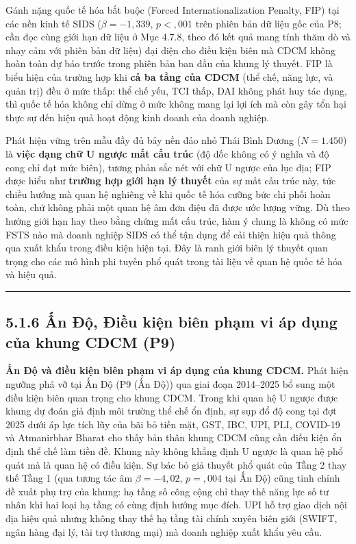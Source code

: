 \documentclass[
  a4paper,
  13pt]{extreport}
\begin{document}
Gánh nặng quốc tế hóa bắt buộc (Forced Internationalization Penalty,
FIP) tại các nền kinh tế SIDS (\(\beta = -1{,}339\), \(p < {,}001\) trên
phiên bản dữ liệu gốc của P8; cần đọc cùng giới hạn dữ liệu ở Mục 4.7.8,
theo đó kết quả mang tính thăm dò và nhạy cảm với phiên bản dữ liệu) đại
diện cho điều kiện biên mà CDCM không hoàn toàn dự báo trước trong phiên
bản ban đầu của khung lý thuyết. FIP là biểu hiện của trường hợp khi
\textbf{cả ba tầng của CDCM} (thể chế, năng lực, và quản trị) đều ở mức
thấp: thể chế yếu, TCI thấp, DAI không phát huy tác dụng, thì quốc tế
hóa không chỉ dừng ở mức không mang lại lợi ích mà còn gây tổn hại thực
sự đến hiệu quả hoạt động kinh doanh của doanh nghiệp.

Phát hiện vững trên mẫu đầy đủ bảy nền đảo nhỏ Thái Bình Dương
(\(N = 1.450\)) là \textbf{việc dạng chữ U ngược mất cấu trúc} (độ dốc
không có ý nghĩa và độ cong chỉ đạt mức biên), tương phản sắc nét với
chữ U ngược của lục địa; FIP được hiểu như \textbf{trường hợp giới hạn
lý thuyết} của sự mất cấu trúc này, tức chiều hướng mà quan hệ nghiêng
về khi quốc tế hóa cưỡng bức chi phối hoàn toàn, chứ không phải một quan
hệ âm đơn điệu đã được ước lượng vững. Dù theo hướng giới hạn hay theo
bằng chứng mất cấu trúc, hàm ý chung là không có mức FSTS nào mà doanh
nghiệp SIDS có thể tận dụng để cải thiện hiệu quả thông qua xuất khẩu
trong điều kiện hiện tại. Đây là ranh giới biên lý thuyết quan trọng cho
các mô hình phi tuyến phổ quát trong tài liệu về quan hệ quốc tế hóa và
hiệu quả.

\begin{center}\rule{0.5\linewidth}{0.5pt}\end{center}

\hypertarget{ux1ea5n-ux111ux1ed9-ux111iux1ec1u-kiux1ec7n-biuxean-phux1ea1m-vi-uxe1p-dux1ee5ng-cux1ee7a-khung-cdcm-p9}{%
\subsection{5.1.6 Ấn Độ, Điều kiện biên phạm vi áp dụng của khung CDCM
(P9)}\label{ux1ea5n-ux111ux1ed9-ux111iux1ec1u-kiux1ec7n-biuxean-phux1ea1m-vi-uxe1p-dux1ee5ng-cux1ee7a-khung-cdcm-p9}}

\textbf{Ấn Độ và điều kiện biên phạm vi áp dụng của khung CDCM.} Phát
hiện ngưỡng phá vỡ tại Ấn Độ (P9 (Ấn Độ)) qua giai đoạn 2014--2025 bổ
sung một điều kiện biên quan trọng cho khung CDCM. Trong khi quan hệ U
ngược được khung dự đoán giả định môi trường thể chế ổn định, sự sụp đổ
độ cong tại đợt 2025 dưới áp lực tích lũy của bãi bỏ tiền mặt, GST, IBC,
UPI, PLI, COVID-19 và Atmanirbhar Bharat cho thấy bản thân khung CDCM
cũng cần điều kiện ổn định thể chế làm tiền đề. Khung này không khẳng
định U ngược là quan hệ phổ quát mà là quan hệ có điều kiện. Sự bác bỏ
giả thuyết phổ quát của Tầng 2 thay thế Tầng 1 (qua tương tác âm
\(\beta = -4{,}02\), \(p = {,}004\) tại Ấn Độ) cũng tinh chỉnh đề xuất
phụ trợ của khung: hạ tầng số công cộng chỉ thay thế năng lực số tư nhân
khi hai loại hạ tầng có cùng định hướng mục đích. UPI hỗ trợ giao dịch
nội địa hiệu quả nhưng không thay thế hạ tầng tài chính xuyên biên giới
(SWIFT, ngân hàng đại lý, tài trợ thương mại) mà doanh nghiệp xuất khẩu
yêu cầu.
\end{document}
